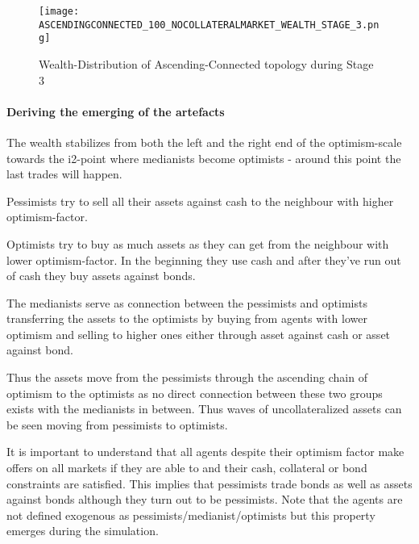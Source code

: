 \documentclass[Bachelorarbeit.tex]{subfiles}
\begin{document}
\begin{figure}[H]
	\centering
  \texttt{[image: ASCENDINGCONNECTED\_100\_NOCOLLATERALMARKET\_WEALTH\_STAGE\_3.png]}
  	\caption{Wealth-Distribution of Ascending-Connected topology during Stage 3}
	\label{fig:markets_ASCENDINGCONNECTED_100_NOCOLLATERALMARKET_WEALTH_STAGE_3}
\end{figure}

\paragraph{Deriving the emerging of the artefacts}

The wealth stabilizes from both the left and the right end of the optimism-scale towards the i2-point where medianists become optimists - around this point the last trades will happen.

\medskip 

Pessimists try to sell all their assets against cash to the neighbour with higher optimism-factor.

\medskip 

Optimists try to buy as much assets as they can get from the neighbour with lower optimism-factor. In the beginning they use cash and after they've run out of cash they buy assets against bonds.

\medskip 

The medianists serve as connection between the pessimists and optimists transferring the assets to the optimists by buying from agents with lower optimism and selling to higher ones either through asset against cash or asset against bond.

\medskip 

Thus the assets move from the pessimists through the ascending chain of optimism to the optimists as no direct connection between these two groups exists with the medianists in between. Thus waves of uncollateralized assets can be seen moving from pessimists to optimists.

\medskip 

It is important to understand that all agents despite their optimism factor make offers on all markets if they are able to and their cash, collateral or bond constraints are satisfied. This implies that pessimists trade bonds as well as assets against bonds although they turn out to be pessimists. Note that the agents are not defined exogenous as pessimists/medianist/optimists but this property emerges during the simulation.
\end{document}
